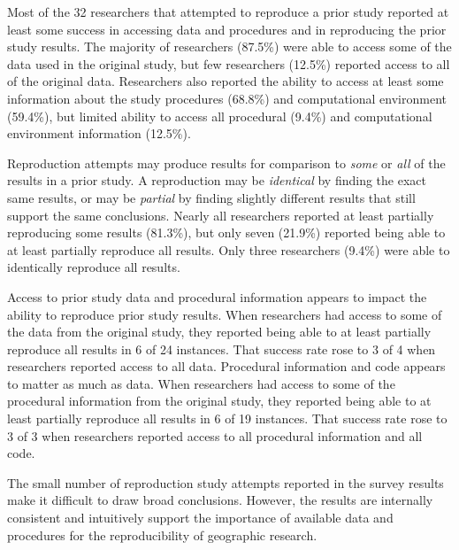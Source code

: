 \documentclass[]{interact}
\theoremstyle{plain}%
\theoremstyle{definition}
\theoremstyle{remark}
\begin{document}
Most of the 32 researchers that attempted to reproduce a prior study reported at least some success in accessing data and procedures and in reproducing the prior study results.   
The majority of researchers (87.5\%) were able to access some of the data used in the original study, but few researchers (12.5\%) reported access to all of the original data.
Researchers also reported the ability to access at least some information about the study procedures (68.8\%) and computational environment (59.4\%), but limited ability to access all procedural (9.4\%) and computational environment information (12.5\%). 

Reproduction attempts may produce results for comparison to \textit{some} or \textit{all} of the results in a prior study.
A reproduction may be \textit{identical} by finding the exact same results, or may be \textit{partial} by finding slightly different results that still support the same conclusions.
Nearly all researchers reported at least partially reproducing some results (81.3\%), but only seven (21.9\%) reported being able to at least partially reproduce all results.
Only three researchers (9.4\%) were able to identically reproduce all results.  

Access to prior study data and procedural information appears to impact the ability to reproduce prior study results. 
When researchers had access to some of the data from the original study, they reported being able to at least partially reproduce all results in 6 of 24 instances. 
That success rate rose to 3 of 4 when researchers reported access to all data. 
Procedural information and code appears to matter as much as data.
When researchers had access to some of the procedural information from the original study, they reported being able to at least partially reproduce all results in 6 of 19 instances.
That success rate rose to 3 of 3 when researchers reported access to all procedural information and all code.

The small number of reproduction study attempts reported in the survey results make it difficult to draw broad conclusions.
However, the results are internally consistent and intuitively support the importance of available data and procedures for the reproducibility of geographic research.


\end{document}
